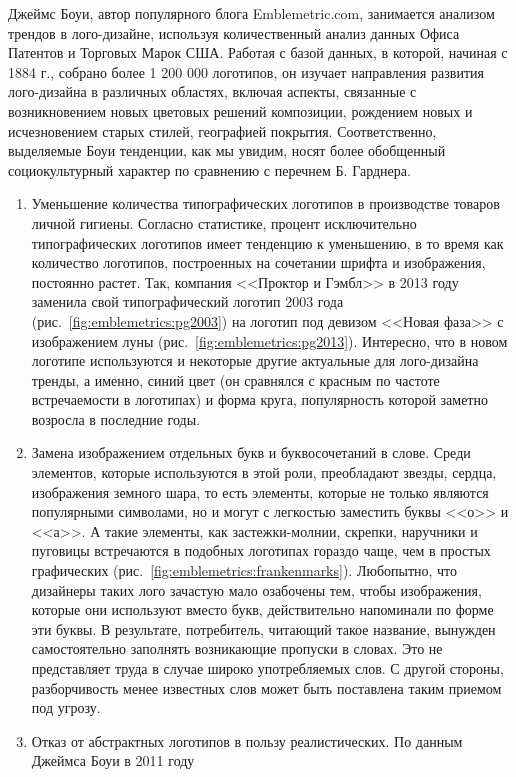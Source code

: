 Джеймс Боуи, автор популярного блога Emblemetric.com, занимается анализом трендов в лого-дизайне,
используя  количественный анализ данных Офиса Патентов и Торговых Марок США. Работая с базой данных,
в которой,  начиная с 1884 г., собрано более 1 200 000 логотипов, он изучает  направления развития
лого-дизайна в различных областях, включая аспекты, связанные с возникновением новых цветовых
решений композиции, рождением новых и исчезновением старых стилей, географией
покрытия. Соответственно, выделяемые Боуи тенденции, как мы увидим, носят более обобщенный
социокультурный характер по сравнению с перечнем Б. Гарднера.

\begin{enumerate}
\item Уменьшение количества  типографических логотипов в производстве товаров личной
  гигиены. Согласно статистике, процент исключительно типографических логотипов имеет тенденцию к
  уменьшению, в то время как количество логотипов,  построенных на сочетании шрифта и изображения,
  постоянно растет. Так, компания <<Проктор и Гэмбл>> в 2013 году заменила свой типографический
  логотип 2003 года (рис.~\ref{fig:emblemetrics:pg2003}) на  логотип  под девизом <<Новая фаза>>
  с изображением луны (рис.~\ref{fig:emblemetrics:pg2013}). Интересно, что в новом логотипе
  используются и некоторые другие актуальные для лого-дизайна тренды,  а именно, синий цвет (он
  сравнялся с красным по частоте встречаемости в логотипах) и форма круга, популярность которой
  заметно возросла в последние годы.
\item Замена изображением отдельных букв и буквосочетаний в слове. Среди элементов, которые
  используются в этой роли, преобладают звезды, сердца, изображения земного шара, то есть элементы,
  которые не только являются популярными символами, но и могут с легкостью заместить буквы <<о>> и
  <<а>>. А такие элементы, как застежки-молнии, скрепки, наручники и пуговицы встречаются в подобных
  логотипах гораздо чаще, чем в простых графических (рис.~\ref{fig:emblemetrics:frankenmarks}).
  Любопытно, что дизайнеры таких лого зачастую мало озабочены тем, чтобы изображения, которые они
  используют вместо букв, действительно напоминали по форме эти буквы. В результате, потребитель,
  читающий такое название, вынужден самостоятельно заполнять возникающие пропуски в словах. Это не
  представляет труда в случае широко употребляемых слов. С другой стороны,  разборчивость менее
  известных слов может быть поставлена таким приемом под угрозу.
\item Отказ от абстрактных логотипов в пользу реалистических. По данным Джеймса Боуи в 2011 году

\end{enumerate}
